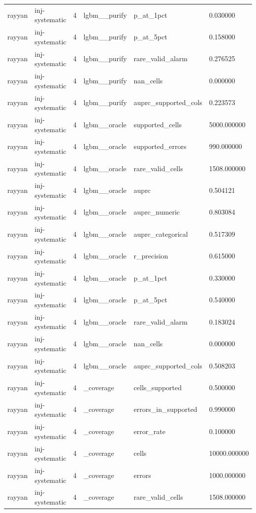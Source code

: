 \begin{tabular}{llllll}
rayyan & inj-systematic & 4 & lgbm\_\_purify & p\_at\_1pct & 0.030000 \\
rayyan & inj-systematic & 4 & lgbm\_\_purify & p\_at\_5pct & 0.158000 \\
rayyan & inj-systematic & 4 & lgbm\_\_purify & rare\_valid\_alarm & 0.276525 \\
rayyan & inj-systematic & 4 & lgbm\_\_purify & nan\_cells & 0.000000 \\
rayyan & inj-systematic & 4 & lgbm\_\_purify & auprc\_supported\_cols & 0.223573 \\
rayyan & inj-systematic & 4 & lgbm\_\_oracle & supported\_cells & 5000.000000 \\
rayyan & inj-systematic & 4 & lgbm\_\_oracle & supported\_errors & 990.000000 \\
rayyan & inj-systematic & 4 & lgbm\_\_oracle & rare\_valid\_cells & 1508.000000 \\
rayyan & inj-systematic & 4 & lgbm\_\_oracle & auprc & 0.504121 \\
rayyan & inj-systematic & 4 & lgbm\_\_oracle & auprc\_numeric & 0.803084 \\
rayyan & inj-systematic & 4 & lgbm\_\_oracle & auprc\_categorical & 0.517309 \\
rayyan & inj-systematic & 4 & lgbm\_\_oracle & r\_precision & 0.615000 \\
rayyan & inj-systematic & 4 & lgbm\_\_oracle & p\_at\_1pct & 0.330000 \\
rayyan & inj-systematic & 4 & lgbm\_\_oracle & p\_at\_5pct & 0.540000 \\
rayyan & inj-systematic & 4 & lgbm\_\_oracle & rare\_valid\_alarm & 0.183024 \\
rayyan & inj-systematic & 4 & lgbm\_\_oracle & nan\_cells & 0.000000 \\
rayyan & inj-systematic & 4 & lgbm\_\_oracle & auprc\_supported\_cols & 0.508203 \\
rayyan & inj-systematic & 4 & \_coverage & cells\_supported & 0.500000 \\
rayyan & inj-systematic & 4 & \_coverage & errors\_in\_supported & 0.990000 \\
rayyan & inj-systematic & 4 & \_coverage & error\_rate & 0.100000 \\
rayyan & inj-systematic & 4 & \_coverage & cells & 10000.000000 \\
rayyan & inj-systematic & 4 & \_coverage & errors & 1000.000000 \\
rayyan & inj-systematic & 4 & \_coverage & rare\_valid\_cells & 1508.000000 \\

\end{tabular}
